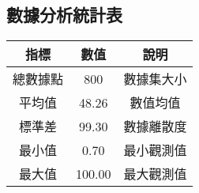 \documentclass{article}
\begin{document}
\begin{CJK}{UTF8}{bsmi}
\section{數據分析統計表}
\begin{tabular}{c|c|c}
\toprule
指標 & 數值 & 說明 \\
\midrule
總數據點 & 800 & 數據集大小 \\
平均值 & 48.26 & 數值均值 \\
標準差 & 99.30 & 數據離散度 \\
最小值 & 0.70 & 最小觀測值 \\
最大值 & 100.00 & 最大觀測值 \\
\bottomrule
\end{tabular}
\end{CJK}
\end{document}
